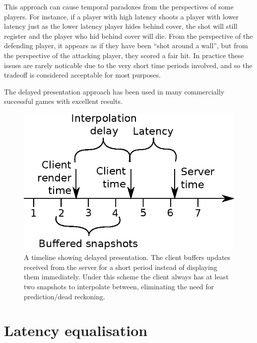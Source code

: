 \documentclass[conference]{IEEEtran}
\begin{document}
	This approach can cause temporal paradoxes from the perspectives of some players. For instance, if a player with high latency shoots a player with lower latency just as the lower latency player hides behind cover, the shot will still register and the player who hid behind cover will die. From the perspective of the defending player, it appears as if they have been ``shot around a wall'', but from the perspective of the attacking player, they scored a fair hit. In practice these issues are rarely noticable due to the very short time periods involved, and so the tradeoff is considered acceptable for most purposes.

	The delayed presentation approach has been used in many commercially successful games with excellent results.

	\begin{figure}
		\centering\includegraphics[width=\linewidth]{figures/interpolation_timeline.eps}
		\caption{A timeline showing delayed presentation. The client buffers updates received from the server for a short period instead of displaying them immediately. Under this scheme the client always has at least two snapshots to interpolate between, eliminating the need for prediction/dead reckoning.}
		\label{fig:interpolation_timeline}
	\end{figure}

	\section{Latency equalisation}

	\cite{yu2012latency}
\end{document}
